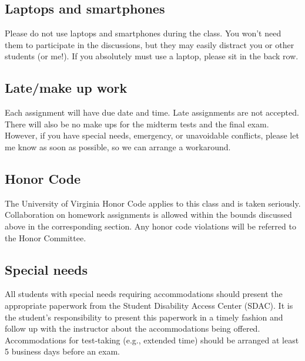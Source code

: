 \documentclass[oneside,11pt]{amsart}
\begin{document}
\subsection{Laptops and smartphones}

Please do not use laptops and smartphones during the class.
You won't need them to participate in the discussions, but they may easily distract 
you or other students (or me!). If you absolutely must use a laptop, please sit in the back row.

\subsection{Late/make up work} Each assignment will have due date and time.
Late assignments are not accepted. There will also be no make ups for the midterm tests and the final exam.
However, if you have special needs, emergency, or unavoidable conflicts, please
let me know as soon as possible, so we can arrange a workaround.

\subsection{Honor Code} The University of Virginia Honor Code applies to this
class and is taken seriously. Collaboration on homework
assignments is allowed within the bounds discussed above 
in the corresponding section.
Any honor code violations will be referred to the
Honor Committee.

\subsection{Special needs}

All students with special needs requiring accommodations should present the
appropriate paperwork from the Student Disability Access Center (SDAC). It is
the student's responsibility to present this paperwork in a timely fashion and
follow up with the instructor about the accommodations being offered.
Accommodations for test-taking (e.g., extended time) should be arranged at
least 5 business days before an exam.
\end{document}
